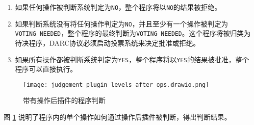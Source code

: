 \documentclass[main.tex]{subfiles}
\begin{document}
\begin{enumerate}
    \item 如果任何操作被判断系统判定为\texttt{NO}，整个程序将以\texttt{NO}的结果被拒绝。
    \item 如果判断系统没有将任何操作判定为\texttt{NO}，并且至少有一个操作被判定为\texttt{VOTING\_NEEDED}，整个程序的最终判断为\texttt{VOTING\_NEEDED}。这个程序将被归类为待决程序，DARC协议必须启动投票系统来决定批准或拒绝。
    \item 如果所有操作都被判断系统判定为\texttt{YES}，整个程序将以\texttt{YES}的结果被批准，整个程序可以直接执行。
\end{enumerate}


\begin{figure}
    \centering
    \texttt{[image: judgement\_plugin\_levels\_after\_ops.drawio.png]}
    \caption{\label{fig:judgement-after-op}带有操作后插件的程序判断}
\end{figure}

图 \ref{fig:judgement-after-op} 说明了程序内的单个操作如何通过操作后插件被判断，得出判断结果。
\end{document}
